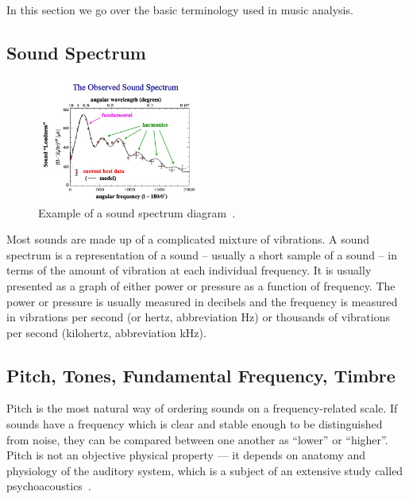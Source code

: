In this section we go over the basic terminology used in music analysis.

\vspace{10pt}

\subsection{Sound Spectrum}

\begin{figure}
  \vspace{-50pt}

  \begin{center}
    \includegraphics[width=0.48\textwidth]{Figures/soundspectrum}
  \end{center}
  \caption{Example of a sound spectrum diagram~\cite{soundspectrum}.}
  \label{fig:soundspectrumexample}
\end{figure}


Most sounds are made up of a complicated mixture of vibrations. A sound spectrum is a representation of a sound – usually a short sample of a sound – in terms of the amount of vibration at each individual frequency. It is usually presented as a graph of either power or pressure as a function of frequency. The power or pressure is usually measured in decibels and the frequency is measured in vibrations per second (or hertz, abbreviation Hz) or thousands of vibrations per second (kilohertz, abbreviation kHz). 

\vspace{10pt}

\subsection{Pitch, Tones, Fundamental Frequency, Timbre}

Pitch is the most natural way of ordering sounds on a frequency-related scale. If sounds have a frequency which is clear and stable enough to be distinguished from noise, they can be compared between one another as “lower” or “higher”. Pitch is not an objective physical property — it depends on anatomy and physiology of the auditory system, which is a subject of an extensive study called psychoacoustics~\cite{pitch}. 

